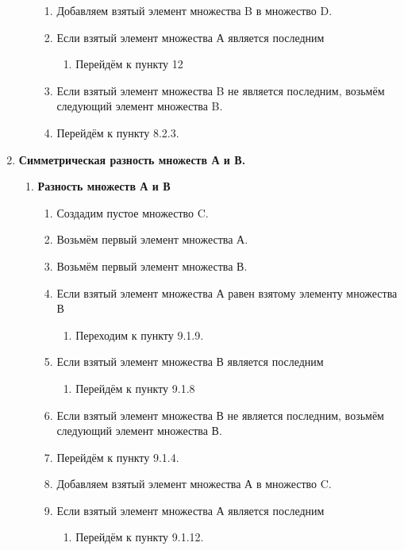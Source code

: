 \documentclass[a4paper,12pt]{extarticle}
\begin{document}
\begin{enumerate}
\begin{enumerate}[label*=\arabic*.]
\begin{enumerate}[label*=\arabic*.]
    \item Добавляем взятый элемент множества B в множество D.
    \item Если взятый элемент множества А является последним
    \begin{enumerate}[label*=\arabic*.]
      \item Перейдём к пункту 12
    \end{enumerate}
    \item Если взятый элемент множества B не является последним, возьмём следующий элемент множества B.
    \item Перейдём к пункту 8.2.3.
  \end{enumerate}
  \end{enumerate}
  \item \textbf{Симметрическая разность множеств А и В.}
  \begin{enumerate}[label*=\arabic*.]
    \item \textbf{Разность множеств А и В}
    \begin{enumerate}[label*=\arabic*.]
      \item Создадим пустое множество C.
      \item Возьмём первый элемент множества А.
      \item Возьмём первый элемент множества В.
      \item Если взятый элемент множества А равен взятому элементу множества В
      \begin{enumerate}[label*=\arabic*.]
        \item Переходим к пункту 9.1.9.
      \end{enumerate}
      \item Если взятый элемент множества В является последним
      \begin{enumerate}[label*=\arabic*.]
        \item Перейдём к пункту 9.1.8
      \end{enumerate}
      \item Если взятый элемент множества В не является последним, возьмём следующий элемент множества В.
      \item Перейдём к пункту 9.1.4.
      \item Добавляем взятый элемент множества А в множество C.
      \item Если взятый элемент множества А является последним
      \begin{enumerate}[label*=\arabic*.]
        \item Перейдём к пункту 9.1.12.

\end{enumerate}
\end{enumerate}
\end{enumerate}
\end{enumerate}
\end{document}
